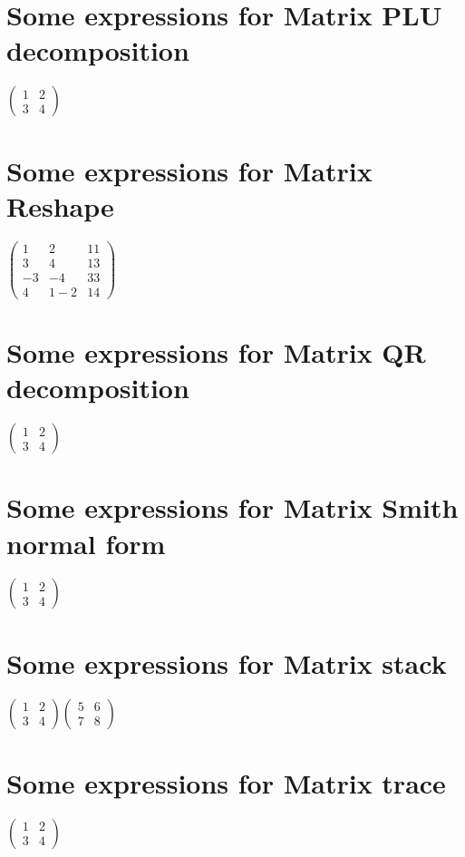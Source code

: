 \documentclass{article}
\begin{document}
\section{Some expressions for Matrix PLU decomposition}

$\left( 
\begin{array}{cc}
1 & 2 \\ 
3 & 4%
\end{array}%
\right) $

\section{Some expressions for Matrix Reshape}

$\left( 
\begin{array}{ccc}
1 & 2 & 11 \\ 
3 & 4 & 13 \\ 
-3 & -4 & 33 \\ 
4 & 1-2 & 14%
\end{array}%
\right) $

\section{Some expressions for Matrix QR decomposition}

$\left( 
\begin{array}{cc}
1 & 2 \\ 
3 & 4%
\end{array}%
\right) $

\section{Some expressions for Matrix Smith normal form}

$\left( 
\begin{array}{cc}
1 & 2 \\ 
3 & 4%
\end{array}%
\right) $

\section{Some expressions for Matrix stack}

$\left( 
\begin{array}{cc}
1 & 2 \\ 
3 & 4%
\end{array}%
\right) \left( 
\begin{array}{cc}
5 & 6 \\ 
7 & 8%
\end{array}%
\right) $

\section{Some expressions for Matrix trace}

$\left( 
\begin{array}{cc}
1 & 2 \\ 
3 & 4%
\end{array}%
\right) $
\end{document}
